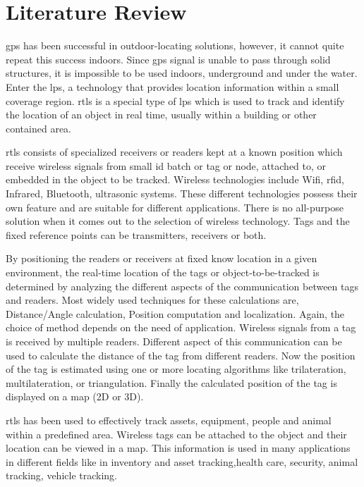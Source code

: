 \section{Literature Review}

\gls{gps} has been successful in outdoor-locating solutions, however, it cannot quite repeat this success indoors. Since \gls{gps} signal is unable to pass through solid structures, it is impossible to be used indoors, underground and under the water. Enter the \gls{lps}, a technology that provides location information within a small coverage region. \gls{rtls} is a special type of \gls{lps} which is used to track and identify the location of an object in real time, usually within a building or other contained area.

\gls{rtls} consists of specialized receivers or readers kept at a known position which receive wireless signals from small \gls{id} batch or tag or node, attached to, or embedded in the object to be tracked. Wireless technologies include Wifi, \gls{rfid}, Infrared, Bluetooth, ultrasonic systems. These different technologies possess their own feature and are suitable for different applications. There is no all-purpose solution when it comes out to the selection of wireless technology. Tags and the fixed reference points can be transmitters, receivers or both. 

By positioning the readers or receivers at fixed know location in a given environment, the real-time location of the tags or object-to-be-tracked is determined by analyzing the different aspects of the communication between tags and readers. Most widely used techniques for these calculations are, Distance/Angle calculation, Position computation and localization. Again, the choice of method depends on the need of application. Wireless signals from a tag is received by multiple readers. Different aspect of this communication can be used to calculate the distance of the tag from different readers. Now the position of the tag is estimated using one or more locating algorithms like trilateration, multilateration, or triangulation. Finally the calculated position of the tag is displayed on a map (2D or 3D).

\gls{rtls} has been used to effectively track assets, equipment, people and animal within a predefined area. Wireless tags can be attached to the object and their location can be viewed in a map. This information is used in many applications in different fields like in inventory and asset tracking,health care, security, animal tracking, vehicle tracking.


